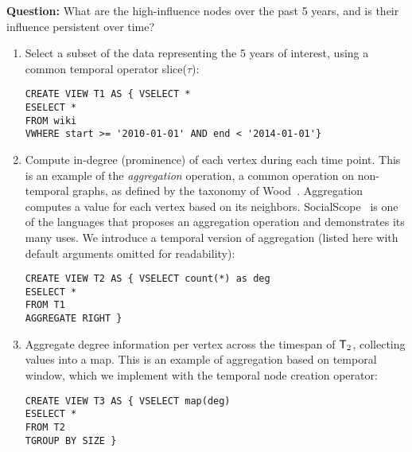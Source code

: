{\bf Question:} What are the high-influence nodes over the past 5
years, and is their influence persistent over time?

\begin{enumerate}[noitemsep,itemindent=\dimexpr\labelwidth+\labelsep\relax,leftmargin=0pt]
\item Select a subset of the data representing the 5 years of
  interest, using a common temporal operator slice($\tau$):

\vspace{-0.1cm}
\begin{small} 
\begin{verbatim}
CREATE VIEW T1 AS { VSELECT *
ESELECT *
FROM wiki
VWHERE start >= '2010-01-01' AND end < '2014-01-01'}
\end{verbatim}
\end{small}

\item Compute in-degree (prominence) of each vertex during each time
  point.  This is an example of the {\em aggregation} operation, a
  common operation on non-temporal graphs, as defined by the taxonomy
  of Wood~\cite{Wood2012}.  Aggregation computes a value for each
  vertex based on its neighbors.  SocialScope~\cite{Amer-Yahia2009} is
  one of the languages that proposes an aggregation operation and
  demonstrates its many uses.  We introduce a temporal version of
  aggregation (listed here with default arguments omitted for
  readability):

\vspace{-0.1cm}
\begin{small} 
\begin{verbatim}
CREATE VIEW T2 AS { VSELECT count(*) as deg
ESELECT *
FROM T1
AGGREGATE RIGHT }
\end{verbatim}
\end{small}

\item Aggregate degree information per vertex across the timespan
  of $\mathsf{T}_2$, collecting values into a map.  This is an example of
  aggregation based on temporal window, which we implement with the
  temporal node creation operator:

\vspace{-0.1cm}
\begin{small} 
\begin{verbatim}
CREATE VIEW T3 AS { VSELECT map(deg)
ESELECT *
FROM T2
TGROUP BY SIZE }
\end{verbatim}
\end{small}


\end{enumerate}
